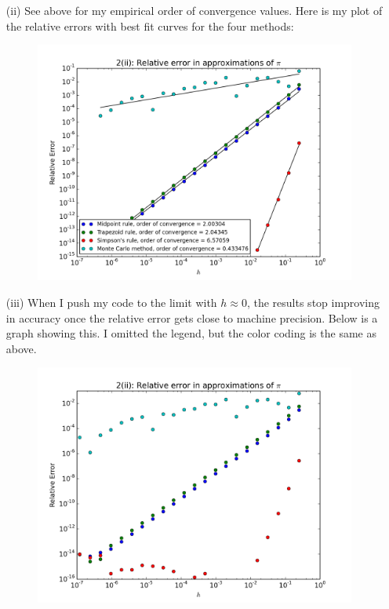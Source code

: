 \documentclass[10pt]{article}
\begin{document}
\begin{itemize}
\item[(ii)] See above for my empirical order of convergence values. Here is my plot of the relative errors with best fit curves for the four methods:

\begin{figure}[H]
  \centering
    \includegraphics[scale=0.6]{pi}
\end{figure}

\item[(iii)] When I push my code to the limit with $ h \approx 0 $, the results stop improving in accuracy once the relative error gets close to machine precision. Below is a graph showing this. I omitted the legend, but the color coding is the same as above.

\begin{figure}[H]
  \centering
    \includegraphics[scale=0.6]{pi_limits}
\end{figure}

\end{itemize}
\end{document}
